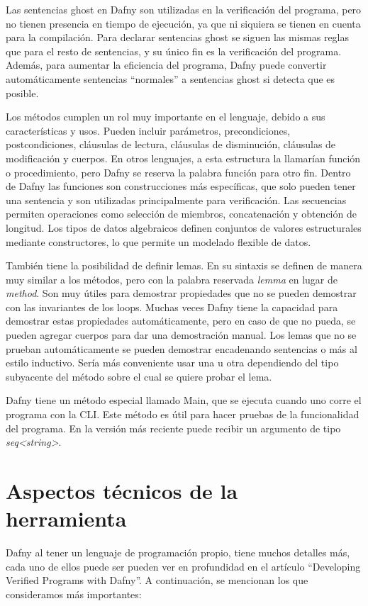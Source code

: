 \documentclass[runningheads]{llncs}
\begin{document}
Las sentencias ghost en Dafny son utilizadas en la verificación del programa, pero no tienen presencia en tiempo de ejecución, ya que ni siquiera se tienen en cuenta para la compilación.
Para declarar sentencias ghost se siguen las mismas reglas que para el resto de sentencias, y su único fin es la verificación del programa.
Además, para aumentar la eficiencia del programa, Dafny puede convertir automáticamente sentencias ``normales'' a sentencias ghost si detecta que es posible.

Los métodos cumplen un rol muy importante en el lenguaje, debido a sus características y usos.
Pueden incluir parámetros, precondiciones, postcondiciones, cláusulas de lectura, cláusulas de disminución, cláusulas de modificación y cuerpos.
En otros lenguajes, a esta estructura la llamarían función o procedimiento, pero Dafny se reserva la palabra función para otro fin.
Dentro de Dafny las funciones son construcciones más específicas, que solo pueden tener una sentencia y son utilizadas principalmente para verificación.
Las secuencias permiten operaciones como selección de miembros, concatenación y obtención de longitud.
Los tipos de datos algebraicos definen conjuntos de valores estructurales mediante constructores, lo que permite un modelado flexible de datos.

También tiene la posibilidad de definir lemas. En su sintaxis se definen de manera muy similar a los métodos, pero con la palabra reservada \textit{lemma} en lugar de \textit{method}.
Son muy útiles para demostrar propiedades que no se pueden demostrar con las invariantes de los loops.
Muchas veces Dafny tiene la capacidad para demostrar estas propiedades automáticamente, pero en caso de que no pueda, se pueden agregar cuerpos para dar una demostración manual.
Los lemas que no se prueban automáticamente se pueden demostrar encadenando sentencias o más al estilo inductivo. Sería más conveniente usar una u otra dependiendo del tipo subyacente del método sobre el cual se quiere probar el lema.

Dafny tiene un método especial llamado Main, que se ejecuta cuando uno corre el programa con la CLI. Este método es útil para hacer pruebas de la funcionalidad del programa.
En la versión más reciente puede recibir un argumento de tipo \textit{seq<string>}.

\section{Aspectos técnicos de la herramienta}
Dafny al tener un lenguaje de programación propio, tiene muchos detalles más, cada uno de ellos puede ser pueden ver en profundidad en el artículo 
``Developing Verified Programs with Dafny''\cite{10.1007/978-3-642-27705-4_7}.
A continuación, se mencionan los que consideramos más importantes:
\end{document}
